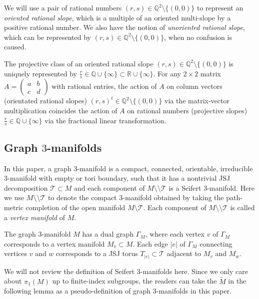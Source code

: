 \documentclass{amsart}
\numberwithin{equation}{section}
\theoremstyle{definition}
\begin{document}
We will use a pair of rational numbers $(r,s)\in \mathbb{Q}^2\setminus \{(0,0)\}$ to represent an {\it oriented rational slope}, which is a multiple of an oriented multi-slope by a positive rational number. 
We also have the notion of {\it unoriented rational slope}, which can be represented by $(r,s)\in \mathbb{Q}^2\setminus \{(0,0)\}$, when no confusion is caused.

The projective class of an oriented rational slope $(r,s)\in \mathbb{Q}^2\setminus \{(0,0)\}$ is uniquely represented by $\frac{r}{s}\in \mathbb{Q}\cup \{\infty\}\subset \mathbb{R}\cup \{\infty\}$. For any $2\times 2$ matrix $A=\begin{pmatrix}
a & b\\
c & d
\end{pmatrix}$ with rational entries, the action of $A$ on column vectors (orientated rational slopes) $(r,s)^t\in \mathbb{Q}^2\setminus \{(0,0)\}$ via the matrix-vector multiplication coincides the action of $A$ on rational numbers (projective slopes) $\frac{r}{s}\in \mathbb{Q}\cup \{\infty\}$ via the fractional linear transformation.



\subsection{Graph $3$-manifolds}\label{basicgraph}
In this paper, a graph $3$-manifold is a compact, connected, orientable, irreducible $3$-manifold with empty or tori boundary, such that it has a nontrivial JSJ decomposition $\mathcal{T}\subset M$ and each component of $M\setminus\setminus \mathcal{T}$ is a Seifert $3$-manifold.
Here we use $M\setminus\setminus \mathcal{T}$ to denote the compact $3$-manifold obtained by taking the path-metric completion of the open manifold $M\setminus \mathcal{T}$.
Each component of $M\setminus\setminus \mathcal{T}$ is called a {\it vertex manifold} of $M$.

The graph $3$-manifold $M$ has a dual graph $\Gamma_M$, where each vertex $v$ of $\Gamma_M$ corresponds to a vertex manifold $M_v\subset M$. Each edge $|e|$ of $\Gamma_M$ connecting vertices $v$ and $w$ corresponds to a JSJ torus $T_{|e|}\subset \mathcal{T}$ adjacent to $M_v$ and $M_w$. 

We will not review the definition of Seifert $3$-manifolds here. Since we only care about $\pi_1(M)$ up to finite-index subgroups, the readers can take the $\tilde{M}$ in the following lemma as a pseudo-definition of graph $3$-manifolds in this paper.
\end{document}
